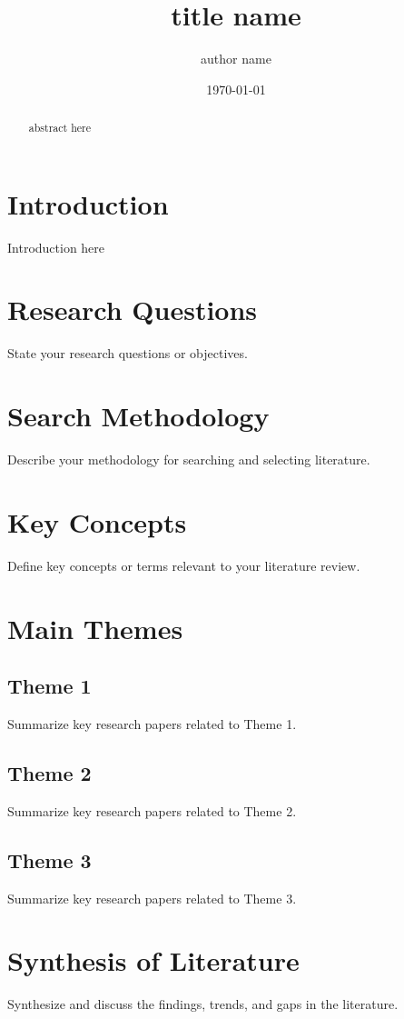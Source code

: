 \documentclass{article}
\title{title name}
\author{author name}
\date{\today}
\begin{document}
\maketitle

\begin{abstract}
    abstract here
\end{abstract}

\section{Introduction}
Introduction here
\section{Research Questions}
State your research questions or objectives.

\section{Search Methodology}
Describe your methodology for searching and selecting literature.

\section{Key Concepts}
Define key concepts or terms relevant to your literature review.

\section{Main Themes}
\subsection{Theme 1}
Summarize key research papers related to Theme 1.

\subsection{Theme 2}
Summarize key research papers related to Theme 2.

\subsection{Theme 3}
Summarize key research papers related to Theme 3.

\section{Synthesis of Literature}
Synthesize and discuss the findings, trends, and gaps in the literature.
\end{document}
